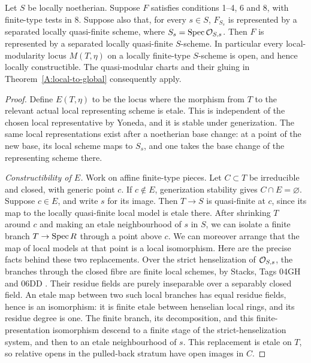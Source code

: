 \begin{theorem}
\label{A:local-models-suffice}
Let $S$ be locally noetherian. Suppose $F$ satisfies conditions
1--4, 6 and 8, with finite-type tests in 8. Suppose also that, for
every $s\in S$, $F_{S_s}$ is represented by a separated locally
quasi-finite scheme, where $S_s=\operatorname{Spec}\mathcal O_{S,s}$.
Then $F$ is represented by a separated locally quasi-finite
$S$-scheme. In particular every local-modularity locus $M(T,\eta)$
on a locally finite-type $S$-scheme is open, and hence locally
constructible. The quasi-modular charts and their gluing in
Theorem~\ref{A:local-to-global} consequently apply.
\end{theorem}
\begin{proof}
Define $E(T,\eta)$ to be the locus where the morphism from $T$
to the relevant actual local representing scheme is etale.
This is independent of the chosen local representative by Yoneda,
and it is stable under generization. The same local representations
exist after a noetherian base change: at a point of the new base,
its local scheme maps to $S_s$, and one takes the base change of
the representing scheme there.

\emph{Constructibility of $E$.} Work on affine finite-type pieces.
Let $C\subset T$ be irreducible and closed, with generic point $c$.
If $c\notin E$, generization stability gives $C\cap E=\varnothing$.
Suppose $c\in E$, and write $s$ for its image. Then $T\to S$ is
quasi-finite at $c$, since its map to the locally quasi-finite local
model is etale there. After shrinking $T$ around $c$ and making an
etale neighbourhood of $s$ in $S$, we can isolate a finite branch
$T\to\operatorname{Spec} R$ through a point above $c$. We can moreover arrange
that the map of local models at that point is a local isomorphism.
Here are the precise facts behind these two replacements. Over the
strict henselization of $\mathcal O_{S,s}$, the branches through the closed
fibre are finite local schemes, by Stacks, Tags 04GH and 06DD
\cite{StacksHenselianBranches}. Their residue fields are purely
inseparable over a separably closed field. An etale map between
two such local branches has equal residue fields, hence is an
isomorphism: it is finite etale between henselian local rings,
and its residue degree is one. The finite branch, its decomposition,
and this finite-presentation isomorphism descend to a finite stage
of the strict-henselization system, and then to an etale neighbourhood
of $s$. This replacement is etale on $T$, so relative opens in the
pulled-back stratum have open images in $C$.


\end{proof}

